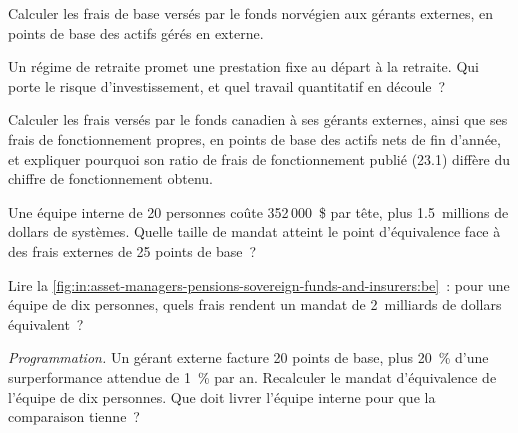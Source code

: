 \begin{exercise}[$\star$]\label{exo:in:asset-managers-pensions-sovereign-funds-and-insurers:2}
Calculer les frais de base versés par le fonds norvégien aux gérants externes, en points de base des actifs gérés en externe.
\end{exercise}

\begin{exercise}[$\star$]\label{exo:in:asset-managers-pensions-sovereign-funds-and-insurers:3}
Un régime de retraite promet une prestation fixe au départ à la retraite. Qui porte le risque d'investissement, et quel travail quantitatif en découle~?
\end{exercise}

\begin{exercise}[$\star\star$]\label{exo:in:asset-managers-pensions-sovereign-funds-and-insurers:4}
Calculer les frais versés par le fonds canadien à ses gérants externes, ainsi que ses frais de fonctionnement propres, en points de base des actifs nets de fin d'année,
et expliquer pourquoi son ratio de frais de fonctionnement publié (23.1) diffère du chiffre de fonctionnement obtenu.
\end{exercise}

\begin{exercise}[$\star\star$]\label{exo:in:asset-managers-pensions-sovereign-funds-and-insurers:5}
Une équipe interne de 20 personnes coûte 352\,000~\$ par tête, plus 1.5~millions de dollars de systèmes. Quelle taille de mandat atteint le point d'équivalence
face à des frais externes de 25 points de base~?
\end{exercise}

\begin{exercise}[$\star\star$]\label{exo:in:asset-managers-pensions-sovereign-funds-and-insurers:6}
Lire la \cref{fig:in:asset-managers-pensions-sovereign-funds-and-insurers:be}~: pour une équipe de dix personnes, quels frais rendent un mandat
de 2~milliards de dollars équivalent~?
\end{exercise}

\begin{exercise}[$\star\star\star$]\label{exo:in:asset-managers-pensions-sovereign-funds-and-insurers:7}
\emph{Programmation.} Un gérant externe facture 20 points de base, plus 20~\% d'une surperformance attendue de 1~\% par an. Recalculer
le mandat d'équivalence de l'équipe de dix personnes. Que doit livrer l'équipe interne pour que la comparaison tienne~?
\end{exercise}

